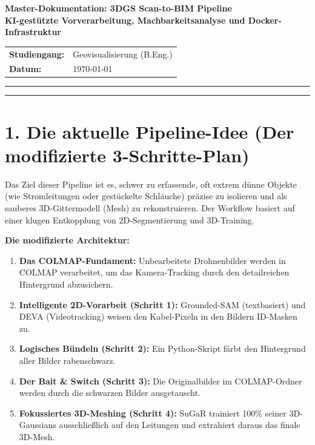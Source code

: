 \documentclass[11pt, a4paper]{article}
\begin{document}
\begin{center}
    {\large\bfseries Master-Dokumentation: 3DGS Scan-to-BIM Pipeline}\\[0.5em]
    {\normalsize\bfseries KI-gest\"utzte Vorverarbeitung, Machbarkeitsanalyse und Docker-Infrastruktur}\\[0.8em]
    \small
    \begin{tabular}{ll}
        \textbf{Studiengang:} & Geovisualisierung (B.Eng.) \\
        \textbf{Datum:}       & \today                     \\
    \end{tabular}
\end{center}

\vspace{-0.5em}
\noindent\rule{\textwidth}{0.4pt}
\tableofcontents
\vspace{1em}
\noindent\rule{\textwidth}{0.4pt}

\section{1. Die aktuelle Pipeline-Idee (Der modifizierte 3-Schritte-Plan)}

Das Ziel dieser Pipeline ist es, schwer zu erfassende, oft extrem d\"unne Objekte (wie Stromleitungen oder gest\"uckelte Schl\"auche) pr\"azise zu isolieren und als sauberes 3D-Gittermodell (Mesh) zu rekonstruieren. Der Workflow basiert auf einer klugen Entkopplung von 2D-Segmentierung und 3D-Training.

\textbf{Die modifizierte Architektur:}
\begin{enumerate}[noitemsep]
    \item \textbf{Das COLMAP-Fundament:} Unbearbeitete Drohnenbilder werden in COLMAP verarbeitet, um das Kamera-Tracking durch den detailreichen Hintergrund abzusichern.
    \item \textbf{Intelligente 2D-Vorarbeit (Schritt 1):} Grounded-SAM (textbasiert) und DEVA (Videotracking) weisen den Kabel-Pixeln in den Bildern ID-Masken zu.
    \item \textbf{Logisches B\"undeln (Schritt 2):} Ein Python-Skript f\"arbt den Hintergrund aller Bilder rabenschwarz.
    \item \textbf{Der Bait \& Switch (Schritt 3):} Die Originalbilder im COLMAP-Ordner werden durch die schwarzen Bilder ausgetauscht.
    \item \textbf{Fokussiertes 3D-Meshing (Schritt 4):} SuGaR trainiert 100\% seiner 3D-Gaussians ausschlie\ss lich auf den Leitungen und extrahiert daraus das finale 3D-Mesh.
\end{enumerate}
\end{document}
